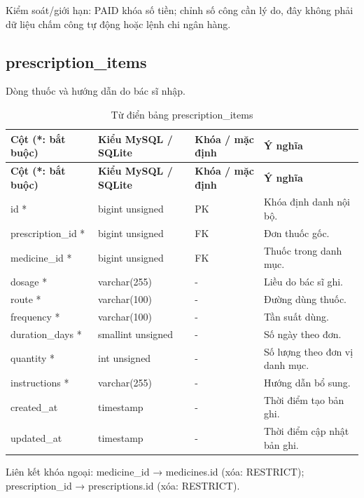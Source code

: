 Kiểm soát/\allowbreak{}giới hạn:\allowbreak{} PAID khóa số tiền; chỉnh số công cần lý do, đây không phải dữ liệu chấm công tự động hoặc lệnh chi ngân hàng.\allowbreak{}

\clearpage

\subsection{prescription\_\allowbreak{}items}
Dòng thuốc và hướng dẫn do bác sĩ nhập.\allowbreak{}


{\fontsize{10}{12}\selectfont\setlength{\tabcolsep}{3pt}\renewcommand{\arraystretch}{1.12}
\begin{longtable}{@{}L{\textwidth-4.86pt\relax} L{\textwidth-3.96pt\relax} L{\textwidth-2.88pt\relax} L{\textwidth-6.3pt\relax}@{}}
\caption{Từ điển bảng prescription\_\allowbreak{}items}\\
\toprule
\textbf{Cột (*:\allowbreak{} bắt buộc)} & \textbf{Kiểu My\allowbreak{}SQL /\allowbreak{} SQLite} & \textbf{Khóa /\allowbreak{} mặc định} & \textbf{Ý nghĩa}\\\midrule
\endfirsthead
\toprule
\textbf{Cột (*:\allowbreak{} bắt buộc)} & \textbf{Kiểu My\allowbreak{}SQL /\allowbreak{} SQLite} & \textbf{Khóa /\allowbreak{} mặc định} & \textbf{Ý nghĩa}\\\midrule
\endhead
\bottomrule\endlastfoot
id * & bigint unsigned & PK & Khóa định danh nội bộ.\allowbreak{}\\[1pt]
prescription\_\allowbreak{}id * & bigint unsigned & FK & Đơn thuốc gốc.\allowbreak{}\\[1pt]
medicine\_\allowbreak{}id * & bigint unsigned & FK & Thuốc trong danh mục.\allowbreak{}\\[1pt]
dosage * & varchar(255) & - & Liều do bác sĩ ghi.\allowbreak{}\\[1pt]
route * & varchar(100) & - & Đường dùng thuốc.\allowbreak{}\\[1pt]
frequency * & varchar(100) & - & Tần suất dùng.\allowbreak{}\\[1pt]
duration\_\allowbreak{}days * & smallint unsigned & - & Số ngày theo đơn.\allowbreak{}\\[1pt]
quantity * & int unsigned & - & Số lượng theo đơn vị danh mục.\allowbreak{}\\[1pt]
instructions * & varchar(255) & - & Hướng dẫn bổ sung.\allowbreak{}\\[1pt]
created\_\allowbreak{}at & timestamp & - & Thời điểm tạo bản ghi.\allowbreak{}\\[1pt]
updated\_\allowbreak{}at & timestamp & - & Thời điểm cập nhật bản ghi.\allowbreak{}\\[1pt]
\end{longtable}}
Liên kết khóa ngoại:\allowbreak{} medicine\_\allowbreak{}id → medicines.\allowbreak{}id (xóa:\allowbreak{} RESTRICT); prescription\_\allowbreak{}id → prescriptions.\allowbreak{}id (xóa:\allowbreak{} RESTRICT).\allowbreak{}


